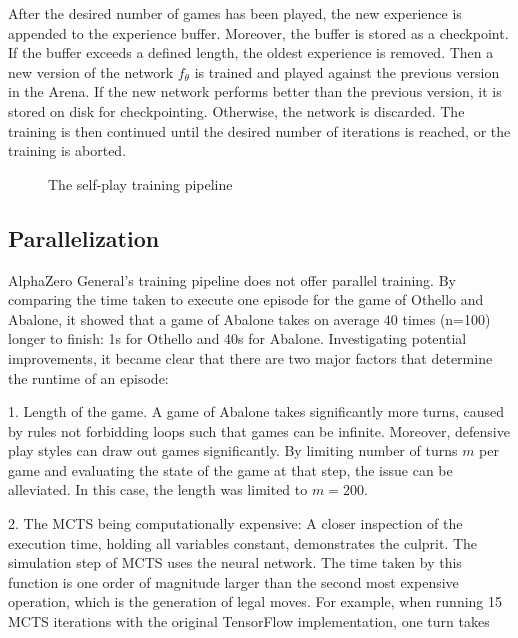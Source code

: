 After the desired number of games has been played, the new experience is appended to the experience buffer. Moreover, the buffer is stored as a checkpoint. If the buffer exceeds a defined length, the oldest experience is removed. Then a new version of the network $f_{\theta}$ is trained and played against the previous version in the Arena. If the new network performs better than the previous version, it is stored on disk for checkpointing. Otherwise, the network is discarded. The training is then continued until the desired number of iterations is reached, or the training is aborted.

\begin{figure}[H]
    \centering
    \caption{The self-play training pipeline}
    \label{training_algorithm}
\end{figure}

\subsection{Parallelization}
\label{parallelization}
AlphaZero General's training pipeline does not offer parallel training. By comparing the time taken to execute one episode for the game of Othello and Abalone, it showed that a game of Abalone takes on average $40$ times (n=100) longer to finish: 1s for Othello and 40s for Abalone. Investigating potential improvements, it became clear that there are two major factors that determine the runtime of an episode:

1. Length of the game. A game of Abalone takes significantly more turns, caused by rules not forbidding loops such that games can be infinite. Moreover, defensive play styles can draw out games significantly. By limiting number of turns $m$ per game and evaluating the state of the game at that step, the issue can be alleviated. In this case, the length was limited to $m=200$.

2. The MCTS being computationally expensive: A closer inspection of the execution time, holding all variables constant, demonstrates the culprit. The simulation step of MCTS uses the neural network. The time taken by this function is one order of magnitude larger than the second most expensive operation, which is the generation of legal moves. For example, when running 15 MCTS iterations with the original TensorFlow implementation, one turn takes

